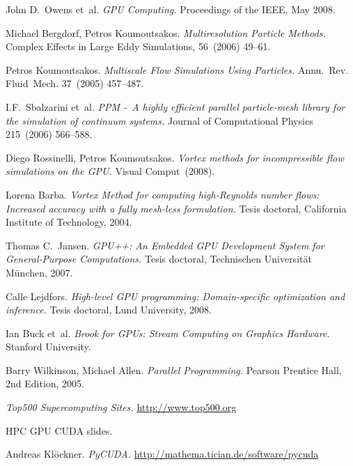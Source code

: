\documentclass[11pt,spanish]{article}
\newcommand{\reftitle}{\textit}
\begin{document}
\newpage
\begin{thebibliography}{99}
    John D.~Owens et~al.
    \reftitle{GPU Computing.}
    Proceedings of the IEEE, May 2008.

    Michael Bergdorf, Petros Koumoutsakos.
    \reftitle{Multiresolution Particle Methods.}
    Complex Effects in Large Eddy Simulations, 56~(2006) 49--61.

    Petros Koumoutsakos.
    \reftitle{Multiscale Flow Simulations Using Particles.}
    Annu.~Rev. Fluid~Mech. 37~(2005) 457--487.

    I.F.~Sbalzarini et~al.
    \reftitle{PPM -~A highly efficient parallel particle-mesh library
      for the simulation of continuum systems.}
    Journal of Computational Physics 215~(2006) 566--588.

    Diego Rossinelli, Petros Koumoutsakos.
    \reftitle{Vortex methods for incompressible flow simulations on the GPU.}
    Visual Comput~(2008).

    Lorena Barba.
    \reftitle{Vortex Method for computing high-Reynolds number flows:
    Increased accuracy with a fully mesh-less formulation.}
    Tesis doctoral, California Institute of Technology, 2004.

    Thomas C.~Jansen.
    \reftitle{GPU++: An Embedded GPU Development System for
      General-Purpose Computations.}
    Tesis doctoral, Technischen Universität München, 2007.

    Calle Lejdfors.
    \reftitle{High-level GPU programming: Domain-specific optimization and inference.}
    Tesis doctoral, Lund University, 2008.

    Ian Buck et~al.
    \reftitle{Brook for GPUs: Stream Computing on Graphics Hardware.}
    Stanford University.

    Barry Wilkinson, Michael Allen.
    \reftitle{Parallel Programming.}
    Pearson Prentice Hall, 2nd Edition, 2005.

    \reftitle{Top500 Supercomputing Sites.}
    \url{http://www.top500.org}

    HPC GPU CUDA slides.

    Andreas Klöckner.
    \reftitle{PyCUDA.}
    \url{http://mathema.tician.de/software/pycuda}
\end{thebibliography}
\end{document}
